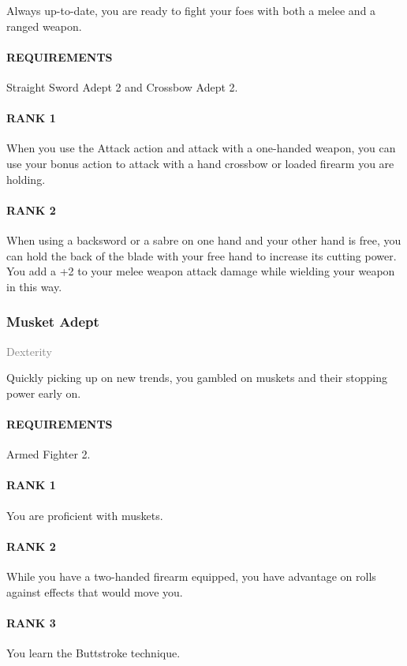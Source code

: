 \normalsize
Always up-to-date, you are ready to fight your foes with both a melee and a ranged weapon.
\paragraph{REQUIREMENTS} Straight Sword Adept 2 and Crossbow Adept 2.
\paragraph{RANK 1} When you use the Attack action and attack with a one-handed weapon, you can use your bonus action to attack with a hand crossbow or loaded firearm you are holding.
\paragraph{RANK 2} When using a backsword or a sabre on one hand and your other hand is free, you can hold the back of the blade with your free hand to increase its cutting power.
You add a +2 to your melee weapon attack damage while wielding your weapon in this way.

\subsubsection{Musket Adept} \label{feat::musketadept}
\small{\textcolor{gray}{Dexterity}}

\normalsize
Quickly picking up on new trends, you gambled on muskets and their stopping power early on.
\paragraph{REQUIREMENTS} Armed Fighter 2.
\paragraph{RANK 1} You are proficient with muskets.
\paragraph{RANK 2} While you have a two-handed firearm equipped, you have advantage on rolls against effects that would move you.
\paragraph{RANK 3} You learn the Buttstroke technique.

